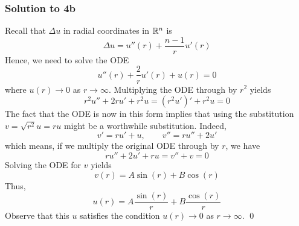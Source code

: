 \subsubsection*{Solution to 4b}

Recall that $\Delta u$ in radial coordinates in $\mathbb{R}^n$ is
$$ \Delta u = u''(r) + \frac{n-1}{r} u'(r) $$
Hence, we need to solve the ODE
$$ u''(r) + \frac{2}{r} u'(r) + u(r) = 0 $$
where $u(r) \to 0$ as $r \to \infty$. Multiplying the ODE through by $r^2$ yields
$$ r^2 u'' + 2r u' + r^2 u = (r^2 u')' + r^2 u = 0 $$
The fact that the ODE is now in this form implies that using the substitution $v = \sqrt{r^2}u = ru$ might be a worthwhile substitution. Indeed,
$$ v' = ru' + u, \quad \quad v'' = ru'' + 2u' $$
which means, if we multiply the original ODE through by $r$, we have
$$ ru'' + 2u' + ru = v'' + v = 0 $$
Solving the ODE for $v$ yields
$$ v(r) = A\sin(r) + B\cos(r) $$
Thus,
$$ u(r) = A \frac{\sin(r)}{r} + B \frac{\cos(r)}{r} $$
Observe that this $u$ satisfies the condition $u(r) \to 0$ as $r \to \infty$. \hfill\qed


